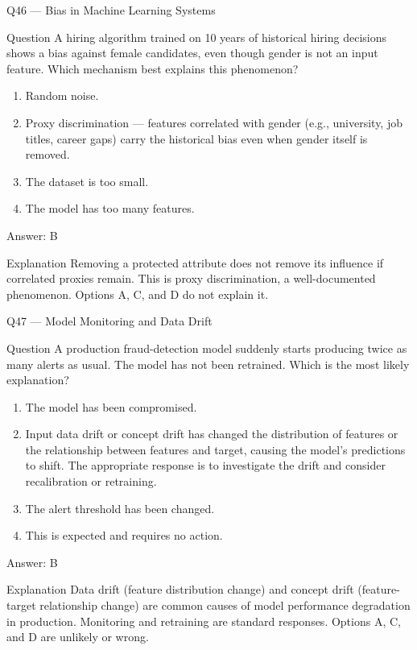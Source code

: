 \documentclass[aspectratio=169,8pt]{beamer}
\begin{document}
	\begin{frame}{Q46 --- Bias in Machine Learning Systems}
		\begin{block}{Question}
			A hiring algorithm trained on 10 years of historical hiring decisions shows a bias against female candidates, even though gender is not an input feature. Which mechanism best explains this phenomenon?
		\end{block}
		\begin{enumerate}
			\item Random noise.
			\item Proxy discrimination --- features correlated with gender (e.g., university, job titles, career gaps) carry the historical bias even when gender itself is removed.
			\item The dataset is too small.
			\item The model has too many features.
		\end{enumerate}
		\begin{exampleblock}{Answer: B}\end{exampleblock}
		\begin{block}{Explanation}
			Removing a protected attribute does not remove its influence if correlated proxies remain. This is proxy discrimination, a well-documented phenomenon. Options A, C, and D do not explain it.
		\end{block}
	\end{frame}
	
	\begin{frame}{Q47 --- Model Monitoring and Data Drift}
		\begin{block}{Question}
			A production fraud-detection model suddenly starts producing twice as many alerts as usual. The model has not been retrained. Which is the most likely explanation?
		\end{block}
		\begin{enumerate}
			\item The model has been compromised.
			\item Input data drift or concept drift has changed the distribution of features or the relationship between features and target, causing the model's predictions to shift. The appropriate response is to investigate the drift and consider recalibration or retraining.
			\item The alert threshold has been changed.
			\item This is expected and requires no action.
		\end{enumerate}
		\begin{exampleblock}{Answer: B}\end{exampleblock}
		\begin{block}{Explanation}
			Data drift (feature distribution change) and concept drift (feature-target relationship change) are common causes of model performance degradation in production. Monitoring and retraining are standard responses. Options A, C, and D are unlikely or wrong.
		\end{block}
	\end{frame}
	
\end{document}
